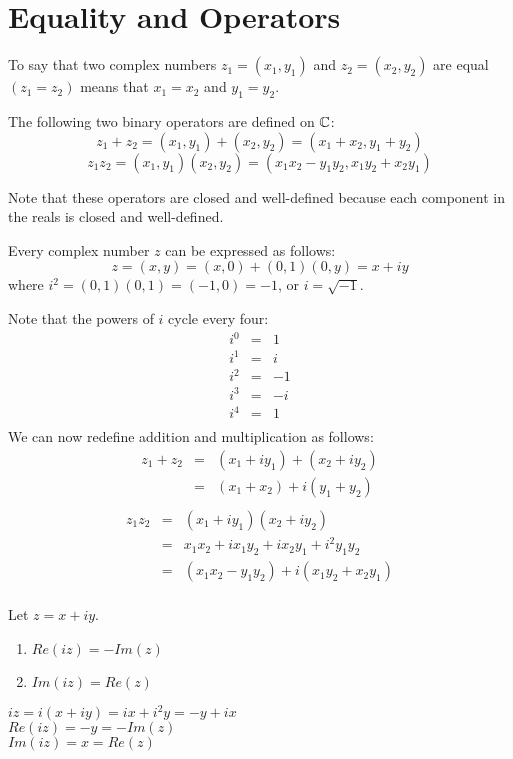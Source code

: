 \documentclass[letterpaper,12pt,fleqn]{article}
\begin{document}
\section*{Equality and Operators}
\begin{definition}
To say that two complex numbers $z_1=(x_1,y_1)$ and $z_2=(x_2,y_2)$ are equal
$(z_1=z_2)$ means that $x_1=x_2$ and $y_1=y_2$.
\end{definition}
\begin{definition}
The following two binary operators are defined on $\mathbb{C}$:
\[z_1+z_2=(x_1,y_1)+(x_2,y_2)=(x_1+x_2,y_1+y_2)\]
\[z_1z_2=(x_1,y_1)(x_2,y_2)=(x_1x_2-y_1y_2,x_1y_2+x_2y_1)\]
\end{definition}
Note that these operators are closed and well-defined because each component in
the reals is closed and well-defined.

Every complex number $z$ can be expressed as follows:
\[z=(x,y)=(x,0)+(0,1)(0,y)=x+iy\]
where $i^2=(0,1)(0,1)=(-1,0)=-1$, or $i=\sqrt{-1}$.

Note that the powers of $i$ cycle every four:
\begin{eqnarray*}
i^0 &=& 1 \\
i^1 &=& i \\
i^2 &=& -1 \\
i^3 &=& -i \\
i^4 &=& 1 \\
\end{eqnarray*}
We can now redefine addition and multiplication as follows:
\begin{eqnarray*}
z_1+z_2 &=& (x_1+iy_1)+(x_2+iy_2) \\
    &=& (x_1+x_2) + i(y_1+y_2) \\
\end{eqnarray*}
\listbreak
\begin{eqnarray*}
z_1z_2 &=& (x_1+iy_1)(x_2+iy_2) \\
    &=& x_1x_2+ix_1y_2+ix_2y_1+i^2y_1y_2 \\
    &=& (x_1x_2-y_1y_2)+i(x_1y_2+x_2y_1) \\
\end{eqnarray*}

\newpage

\begin{theorem}
Let $z=x+iy$.
\begin{enumerate}
\item $Re(iz)=-Im(z)$
\item $Im(iz)=Re(z)$
\end{enumerate}
\end{theorem}

\begin{theproof}
$iz=i(x+iy)=ix+i^2y=-y+ix$ \\
$Re(iz)=-y=-Im(z)$ \\
$Im(iz)=x=Re(z)$
\end{theproof}
\end{document}
